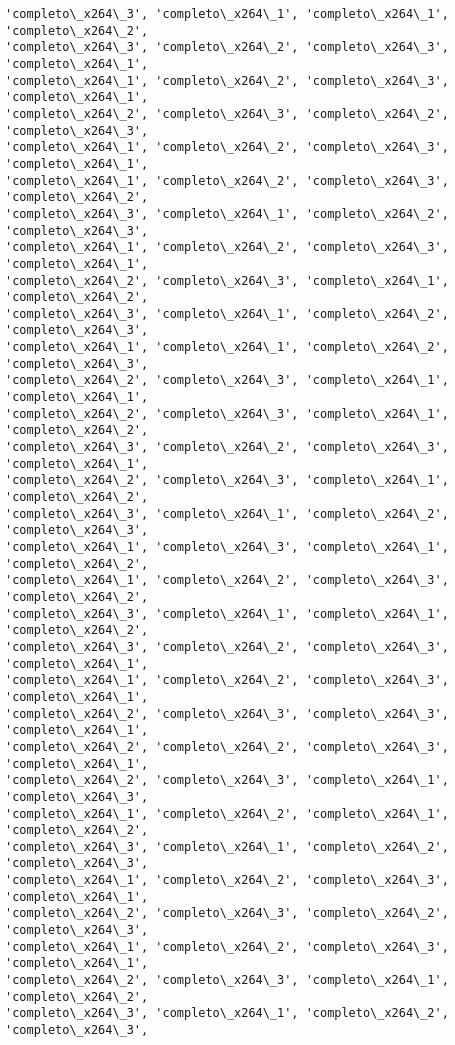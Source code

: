 \documentclass[11pt]{article}
\begin{document}
\begin{Verbatim}[commandchars=\\\{\}]
'completo\_x264\_3', 'completo\_x264\_1', 'completo\_x264\_1', 'completo\_x264\_2',
'completo\_x264\_3', 'completo\_x264\_2', 'completo\_x264\_3', 'completo\_x264\_1',
'completo\_x264\_1', 'completo\_x264\_2', 'completo\_x264\_3', 'completo\_x264\_1',
'completo\_x264\_2', 'completo\_x264\_3', 'completo\_x264\_2', 'completo\_x264\_3',
'completo\_x264\_1', 'completo\_x264\_2', 'completo\_x264\_3', 'completo\_x264\_1',
'completo\_x264\_1', 'completo\_x264\_2', 'completo\_x264\_3', 'completo\_x264\_2',
'completo\_x264\_3', 'completo\_x264\_1', 'completo\_x264\_2', 'completo\_x264\_3',
'completo\_x264\_1', 'completo\_x264\_2', 'completo\_x264\_3', 'completo\_x264\_1',
'completo\_x264\_2', 'completo\_x264\_3', 'completo\_x264\_1', 'completo\_x264\_2',
'completo\_x264\_3', 'completo\_x264\_1', 'completo\_x264\_2', 'completo\_x264\_3',
'completo\_x264\_1', 'completo\_x264\_1', 'completo\_x264\_2', 'completo\_x264\_3',
'completo\_x264\_2', 'completo\_x264\_3', 'completo\_x264\_1', 'completo\_x264\_1',
'completo\_x264\_2', 'completo\_x264\_3', 'completo\_x264\_1', 'completo\_x264\_2',
'completo\_x264\_3', 'completo\_x264\_2', 'completo\_x264\_3', 'completo\_x264\_1',
'completo\_x264\_2', 'completo\_x264\_3', 'completo\_x264\_1', 'completo\_x264\_2',
'completo\_x264\_3', 'completo\_x264\_1', 'completo\_x264\_2', 'completo\_x264\_3',
'completo\_x264\_1', 'completo\_x264\_3', 'completo\_x264\_1', 'completo\_x264\_2',
'completo\_x264\_1', 'completo\_x264\_2', 'completo\_x264\_3', 'completo\_x264\_2',
'completo\_x264\_3', 'completo\_x264\_1', 'completo\_x264\_1', 'completo\_x264\_2',
'completo\_x264\_3', 'completo\_x264\_2', 'completo\_x264\_3', 'completo\_x264\_1',
'completo\_x264\_1', 'completo\_x264\_2', 'completo\_x264\_3', 'completo\_x264\_1',
'completo\_x264\_2', 'completo\_x264\_3', 'completo\_x264\_3', 'completo\_x264\_1',
'completo\_x264\_2', 'completo\_x264\_2', 'completo\_x264\_3', 'completo\_x264\_1',
'completo\_x264\_2', 'completo\_x264\_3', 'completo\_x264\_1', 'completo\_x264\_3',
'completo\_x264\_1', 'completo\_x264\_2', 'completo\_x264\_1', 'completo\_x264\_2',
'completo\_x264\_3', 'completo\_x264\_1', 'completo\_x264\_2', 'completo\_x264\_3',
'completo\_x264\_1', 'completo\_x264\_2', 'completo\_x264\_3', 'completo\_x264\_1',
'completo\_x264\_2', 'completo\_x264\_3', 'completo\_x264\_2', 'completo\_x264\_3',
'completo\_x264\_1', 'completo\_x264\_2', 'completo\_x264\_3', 'completo\_x264\_1',
'completo\_x264\_2', 'completo\_x264\_3', 'completo\_x264\_1', 'completo\_x264\_2',
'completo\_x264\_3', 'completo\_x264\_1', 'completo\_x264\_2', 'completo\_x264\_3',

\end{Verbatim}
\end{document}
